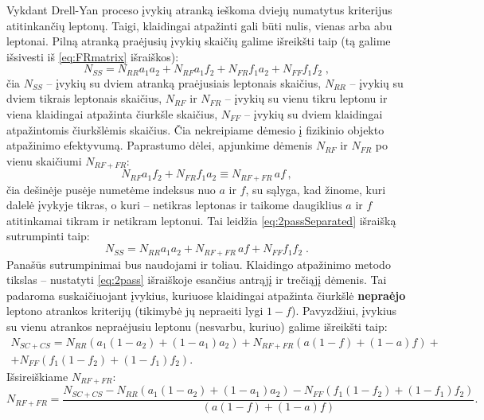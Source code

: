 \documentclass[a4paper, 12pt, oneside]{article}
\newlength\q
\begin{document}
Vykdant Drell-Yan proceso įvykių atranką ieškoma dviejų numatytus kriterijus atitinkančių leptonų.
Taigi, klaidingai atpažinti gali būti nulis, vienas arba abu leptonai.
Pilną atranką praėjusių įvykių skaičių galime išreikšti taip (tą galime išsivesti iš \eqref{eq:FRmatrix} išraiškos):
\begin{equation}
\label{eq:2passSeparated}
	N_{SS} = N_{RR} a_1 a_2 + N_{RF} a_1f_2 + N_{FR} f_1a_2 + N_{FF} f_1 f_2 \; ,
\end{equation}
čia $N_{SS}$ -- įvykių su dviem atranką praėjusiais leptonais skaičius, $N_{RR}$ -- įvykių su dviem tikrais
leptonais skaičius, $N_{RF}$ ir $N_{FR}$ -- įvykių su vienu tikru leptonu ir viena klaidingai atpažinta čiurkšle skaičius,
$N_{FF}$ -- įvykių su dviem klaidingai
atpažintomis čiurkšlėmis skaičius.
Čia nekreipiame dėmesio į fizikinio objekto atpažinimo efektyvumą.
Paprastumo dėlei, apjunkime dėmenis $N_{RF}$ ir $N_{FR}$ po vienu skaičiumi $N_{RF+FR}$:
\begin{equation}
	N_{RF} a_1f_2 + N_{FR} f_1a_2 \equiv N_{RF\!+\!FR}\,af \, , 
\end{equation}
čia dešinėje pusėje numetėme indeksus nuo $a$ ir $f$, su sąlyga, kad žinome, kuri dalelė įvykyje tikras, o kuri -- netikras
leptonas ir taikome daugiklius $a$ ir $f$ atitinkamai tikram ir netikram leptonui.
Tai leidžia \eqref{eq:2passSeparated} išraišką sutrumpinti taip:
\begin{equation}
\label{eq:2pass}
	N_{SS} = N_{RR} a_1 a_2 + N_{RF\!+\!FR}\, af + N_{FF} f_1 f_2 \; .
\end{equation}
Panašūs sutrumpinimai bus naudojami ir toliau.
Klaidingo atpažinimo metodo tikslas -- nustatyti \eqref{eq:2pass} išraiškoje esančius antrąjį ir trečiąjį dėmenis.
Tai padaroma suskaičiuojant įvykius, kuriuose klaidingai atpažinta čiurkšlė \textbf{nepraėjo} leptono atrankos kriterijų
(tikimybė jų nepraeiti lygi $1\!-\!f$).
Pavyzdžiui, įvykius su vienu atrankos nepraėjusiu leptonu (nesvarbu, kuriuo) galime išreikšti taip:
\begin{equation}
	\label{eq:1fail}
	\begin{gathered}
		N_{SC\!+\!CS} = N_{RR} \left( a_1(1-a_2) + (1-a_1)a_2 \right) + N_{RF\!+\!FR} \left( a(1-f) + (1-a)f \right) + \\
			   + N_{FF} \left( f_1(1-f_2) + (1-f_1)f_2 \right).
	\end{gathered}
\end{equation}
Išsireiškiame $N_{RF\!+\!FR}$:
\begin{equation}
\label{eq:realfake}
	N_{RF\!+\!FR} = \frac{ N_{SC\!+\!CS} - N_{RR} (a_1(1-a_2)+(1-a_1)a_2) - N_{FF} (f_1(1-f_2)+(1-f_1)f_2) }
				   { (a(1-f)+(1-a)f) }.
\end{equation}
\end{document}
